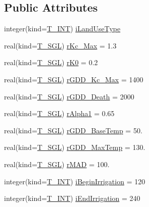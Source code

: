 \subsection*{Public Attributes}
\begin{DoxyCompactItemize}
\item 
integer(kind=\hyperlink{namespacetypes_a4e4d040a4425196c4d43be63e7e6103a}{T\_\-INT}) \hyperlink{typetypes_1_1_t___i_r_r_i_g_a_t_i_o_n___l_o_o_k_u_p_a80e356e4bb51b1d7e76d6b68713a8c58}{iLandUseType}
\item 
real(kind=\hyperlink{namespacetypes_af3012489af4c138f271f1bce244b7e51}{T\_\-SGL}) \hyperlink{typetypes_1_1_t___i_r_r_i_g_a_t_i_o_n___l_o_o_k_u_p_a7569770d20dbe6ed60daf9d5a3886c4a}{rKc\_\-Max} = 1.3
\item 
real(kind=\hyperlink{namespacetypes_af3012489af4c138f271f1bce244b7e51}{T\_\-SGL}) \hyperlink{typetypes_1_1_t___i_r_r_i_g_a_t_i_o_n___l_o_o_k_u_p_aa283531c1967fdba3d2f6c70f34694bf}{rK0} = 0.2
\item 
real(kind=\hyperlink{namespacetypes_af3012489af4c138f271f1bce244b7e51}{T\_\-SGL}) \hyperlink{typetypes_1_1_t___i_r_r_i_g_a_t_i_o_n___l_o_o_k_u_p_a3e5670ad237b8c82a3e07d40fc4c9e5b}{rGDD\_\-Kc\_\-Max} = 1400
\item 
real(kind=\hyperlink{namespacetypes_af3012489af4c138f271f1bce244b7e51}{T\_\-SGL}) \hyperlink{typetypes_1_1_t___i_r_r_i_g_a_t_i_o_n___l_o_o_k_u_p_ab81656b40860757547ff176fc1c9cb55}{rGDD\_\-Death} = 2000
\item 
real(kind=\hyperlink{namespacetypes_af3012489af4c138f271f1bce244b7e51}{T\_\-SGL}) \hyperlink{typetypes_1_1_t___i_r_r_i_g_a_t_i_o_n___l_o_o_k_u_p_a8c92049eb0a84f405b9923f184e67eac}{rAlpha1} = 0.65
\item 
real(kind=\hyperlink{namespacetypes_af3012489af4c138f271f1bce244b7e51}{T\_\-SGL}) \hyperlink{typetypes_1_1_t___i_r_r_i_g_a_t_i_o_n___l_o_o_k_u_p_a54f726a788b289484f93b69d8f1f4fcd}{rGDD\_\-BaseTemp} = 50.
\item 
real(kind=\hyperlink{namespacetypes_af3012489af4c138f271f1bce244b7e51}{T\_\-SGL}) \hyperlink{typetypes_1_1_t___i_r_r_i_g_a_t_i_o_n___l_o_o_k_u_p_a6d3f8f4cef4d393caa4b7b7bf78a94bc}{rGDD\_\-MaxTemp} = 130.
\item 
real(kind=\hyperlink{namespacetypes_af3012489af4c138f271f1bce244b7e51}{T\_\-SGL}) \hyperlink{typetypes_1_1_t___i_r_r_i_g_a_t_i_o_n___l_o_o_k_u_p_ac73562e07af876150ff86ff0232ce3d7}{rMAD} = 100.
\item 
integer(kind=\hyperlink{namespacetypes_a4e4d040a4425196c4d43be63e7e6103a}{T\_\-INT}) \hyperlink{typetypes_1_1_t___i_r_r_i_g_a_t_i_o_n___l_o_o_k_u_p_acf2ac0250419510caa9e365ab59ed32b}{iBeginIrrigation} = 120
\item 
integer(kind=\hyperlink{namespacetypes_a4e4d040a4425196c4d43be63e7e6103a}{T\_\-INT}) \hyperlink{typetypes_1_1_t___i_r_r_i_g_a_t_i_o_n___l_o_o_k_u_p_a5a277d72ee562073cd0bf1693ccf59f0}{iEndIrrigation} = 240
\end{DoxyCompactItemize}


